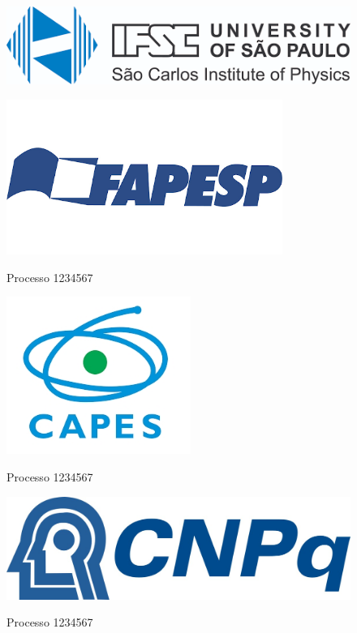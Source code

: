 \section*{}

\begin{figure}
    \centering
    \includegraphics[scale = 0.8]{Figuras/Logos/ifsclogo.png}
    \label{ifsc}
\end{figure}
\begin{minipage}{0.33\linewidth}
\centering
    \begin{figure}[b]
    \centering
    \includegraphics[width =9cm]{Figuras/Logos/Fapesp.png}

    
    \vspace{0.5cm}
    {\small{Processo 1234567}}
    \end{figure}
\end{minipage}
\begin{minipage}{0.33\linewidth}
\centering
    \begin{figure}[b]
    \centering
    \includegraphics[width =6cm]{Figuras/Logos/capes.jpg}
    
    
    \vspace{0.5cm}
    {\small{Processo 1234567}}
    \end{figure}
\end{minipage}
\begin{minipage}{0.33\linewidth}
\centering
    \begin{figure}[b]
    \centering
    \includegraphics[width=12cm]{Figuras/Logos/cnpq.jpg}
    
    \vspace{0.9cm}
    {\small{Processo 1234567}}
    \end{figure}
\end{minipage}